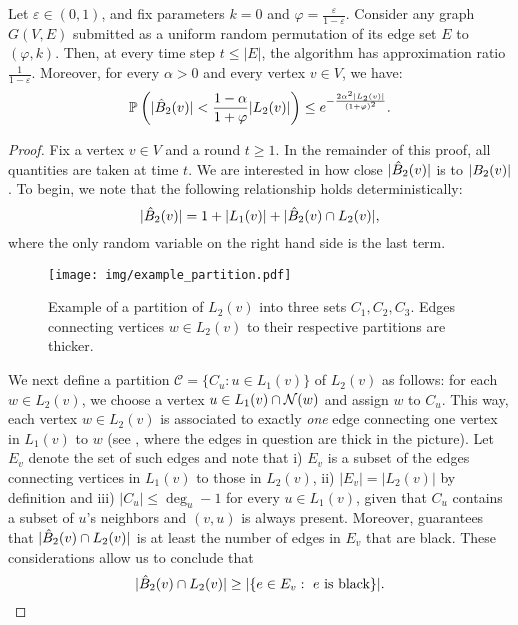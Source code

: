 \begin{theorem}\label{thm:random_seq_quality}
    Let  $\varepsilon \in (0,1)$,  and fix  parameters $k = 0$ and $\varphi = \frac{\varepsilon}{1-\varepsilon}$. Consider any  graph $G(V,E)$ submitted as  a  uniform  random permutation of its edge set $E$ to \lazyscheme$(\varphi,k)$. Then, at every time step $t\le |E|$, the algorithm has approximation ratio $\frac{1}{1-\varepsilon}$. Moreover, for every $\alpha > 0$ and every vertex $v  \in V$, we have:
    \[
        \mathbb{P}_{} \left( |\hat{B}_2(v)| < \frac{1 - \alpha}{1 + \varphi}|L_2(v)| \right)\le e^{-\frac{2\alpha^2|L_2(v)|}{(1 + \varphi)^2}}.
    \]
\end{theorem}
\begin{proof}
Fix a vertex $v \in V$ and a round $t \geq 1$. In the remainder of this proof, all quantities are taken at time $t$. We are interested in how close $|\hat{B}_2(v)|$ is to $|B_2(v)|$. To begin, we note that the following relationship holds deterministically:
\begin{equation}\label{eq:apxball_det}
    |\hat{B}_2(v)| = 1 + |L_1(v)| + |\hat{B}_2(v)\cap L_2(v)|,
\end{equation}
where the only random variable on the right hand side is the last term. 
\begin{figure}[h!]
    \centering
    \texttt{[image: img/example\_partition.pdf]}
    \caption{Example of a partition of $L_2(v)$ into three sets $C_1, C_2, C_3$. Edges connecting vertices $w \in L_2(v)$ to their respective partitions are thicker.}
    \label{fig:L2_partition}
\end{figure}
We next define a partition $\mathcal{C} = \{C_{u}: u\in L_1(v)\}$ of $L_2(v)$ as follows: for each $w \in L_2(v)$, we choose a vertex $u \in L_1(v) \cap \mathcal{N}(w)$ and assign $w$ to $C_u$. This way, each vertex $w\in L_2(v)$ is associated to exactly \emph{one} edge connecting one vertex in $L_1(v)$ to $w$ (see , where the edges in question are thick in the picture). Let $E_v$ denote the set of such edges and note that i) $E_v$ is a subset of the edges connecting vertices in $L_1(v)$ to those in $L_2(v)$, ii) $|E_v| = |L_2(v)|$ by definition and iii) $|C_u|\le \deg_u - 1$ for every $u\in L_1(v)$, given that $C_u$ contains a subset of $u$'s neighbors and $(v, u)$ is always present. Moreover,  guarantees that $|\hat{B}_2(v)\cap L_2(v)|$ is at least the number of edges in $E_v$ that are black. 
These considerations allow us to conclude that
\[
    |\hat{B}_2(v)\cap L_2(v)| \ge |\{e\in E_v:\text{ $e$ is black}\}|.
\]
\end{proof}
